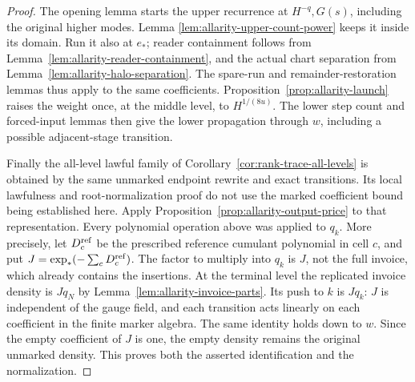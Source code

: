 \begin{proof}
The opening lemma starts the upper recurrence at $H^{-q},G(s)$,
including the original higher modes. Lemma
\ref{lem:allarity-upper-count-power} keeps it inside its domain.
Run it also at $e_*$; reader containment follows from
Lemma~\ref{lem:allarity-reader-containment}, and the actual chart
separation from Lemma~\ref{lem:allarity-halo-separation}.
The spare-run and remainder-restoration lemmas thus apply to the
same coefficients. Proposition~\ref{prop:allarity-launch} raises the
weight once, at the middle level, to $H^{1/(8u)}$. The lower step
count and forced-input lemmas then give the lower propagation through
$w$, including a possible adjacent-stage transition.

Finally the all-level lawful family of
Corollary~\ref{cor:rank-trace-all-levels} is obtained by the same
unmarked endpoint rewrite and exact transitions. Its local lawfulness
and root-normalization proof do not use the marked coefficient bound
being established here. Apply Proposition~\ref{prop:allarity-output-price}
to that representation. Every polynomial operation above was applied to $q_k$. More
precisely, let $D^{\rm ref}_c$ be the prescribed reference cumulant
polynomial in cell $c$, and put
$J=\exp_*(-\sum_cD^{\rm ref}_c)$. The factor to multiply into $q_k$
is $J$, not the full invoice, which already contains the insertions.
At the terminal level the replicated invoice density is $Jq_N$ by
Lemma~\ref{lem:allarity-invoice-parts}. Its push to $k$ is $Jq_k$:
$J$ is independent of the gauge field, and each transition acts linearly
on each coefficient in the finite marker algebra. The same identity
holds down to $w$. Since the empty coefficient of $J$ is one, the
empty density remains the original unmarked density. This proves
both the asserted identification and the normalization.
\end{proof}
